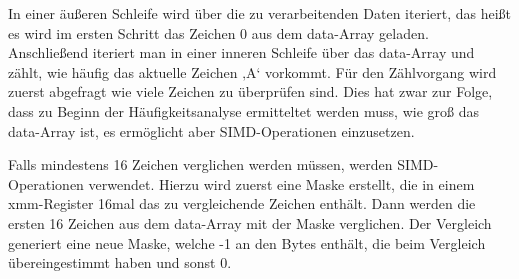 \documentclass[course=erap]{aspdoc}
\begin{document}
In einer äußeren Schleife wird über die zu verarbeitenden Daten iteriert, das heißt es wird im ersten Schritt das Zeichen 0 aus dem data-Array geladen. Anschließend iteriert man in einer inneren Schleife über das data-Array und zählt, wie häufig das aktuelle Zeichen ‚A‘ vorkommt. Für den Zählvorgang wird zuerst abgefragt wie viele Zeichen zu überprüfen sind. Dies hat zwar zur Folge, dass zu Beginn der Häufigkeitsanalyse ermitteltet werden muss, wie groß das data-Array ist, es ermöglicht aber SIMD-Operationen einzusetzen.

Falls mindestens 16 Zeichen verglichen werden müssen, werden SIMD-Operationen verwendet. Hierzu wird zuerst eine Maske erstellt, die in einem xmm-Register 16mal das zu vergleichende Zeichen enthält. Dann werden die ersten 16 Zeichen aus dem data-Array mit der Maske verglichen. Der Vergleich generiert eine neue Maske, welche -1 an den Bytes enthält, die beim Vergleich übereingestimmt haben und sonst 0.
\end{document}
